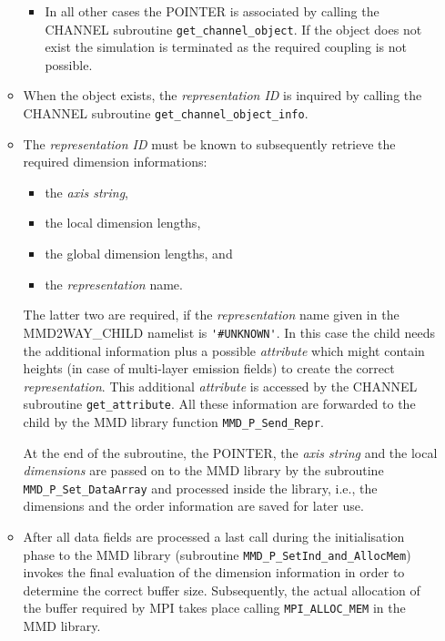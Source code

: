 \documentclass[11pt,twoside]{article}
\begin{document}
\begin{itemize}
\begin{itemize}
\begin{itemize}
\item In all other cases the {\footnotesize POINTER} is associated by calling 
the CHANNEL 
subroutine \verb|get_channel_object|. If the object does not exist the
simulation is terminated as the required coupling is not possible. 
\end{itemize}%

\item When the object exists, the {\it representation ID} is inquired by 
calling the CHANNEL subroutine \verb|get_channel_object_info|. 

\item The {\it representation ID} must be known to 
subsequently retrieve the required dimension informations: 
\begin{itemize}%
\item the {\it axis string},
\item the local dimension lengths,
\item  the global dimension lengths, and 
\item the {\it representation} name. 
\end{itemize}%
The latter two are required, if the {\it representation} name given in the
 MMD2WAY\_CHILD 
namelist is \verb|'#UNKNOWN'|. In this case the child
needs the additional information plus a possible {\it attribute} which might 
contain heights (in case of multi-layer emission fields) to create the correct 
{\it representation}. 
This additional {\it attribute} is accessed by the CHANNEL subroutine
\verb|get_attribute|. All these information are forwarded to the child
 by the MMD library function \verb|MMD_P_Send_Repr|.

At the end of the subroutine, the {\footnotesize POINTER}, the {\it axis
string} and the local 
{\it dimensions} are  passed on to the MMD library by the subroutine 
\verb|MMD_P_Set_DataArray| and 
processed inside the library, i.e., the dimensions and the order information
are saved for later use. 

\item After all data fields are processed a last call during the initialisation 
phase
 to the MMD library (subroutine \verb|MMD_P_SetInd_and_AllocMem|)
invokes the final evaluation of the dimension information in order to determine
the correct buffer size. Subsequently, the actual allocation of the buffer
required by MPI takes place calling \verb|MPI_ALLOC_MEM| in the MMD library.
\end{itemize}%
\end{itemize}%
\end{document}
